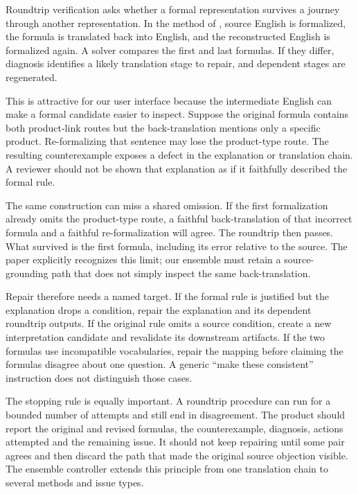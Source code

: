 \label{sec:languages-roundtrip}
Roundtrip verification asks whether a formal representation survives a journey
through another representation. In the method of \citet{roundtrip2026}, source
English is formalized, the formula is translated back into English, and the
reconstructed English is formalized again. A solver compares the first and
last formulas. If they differ, diagnosis identifies a likely translation
stage to repair, and dependent stages are regenerated.

This is attractive for our user interface because the intermediate English
can make a formal candidate easier to inspect. Suppose the original formula
contains both product-link routes but the back-translation mentions only a
specific product. Re-formalizing that sentence may lose the product-type
route. The resulting counterexample exposes a defect in the explanation or
translation chain. A reviewer should not be shown that explanation as if it
faithfully described the formal rule.

The same construction can miss a shared omission. If the first formalization
already omits the product-type route, a faithful back-translation of that
incorrect formula and a faithful re-formalization will agree. The roundtrip
then passes. What survived is the first formula, including its error relative
to the source. The paper explicitly recognizes this limit; our ensemble must
retain a source-grounding path that does not simply inspect the same
back-translation.


Repair therefore needs a named target. If the formal rule is justified but
the explanation drops a condition, repair the explanation and its dependent
roundtrip outputs. If the original rule omits a source condition, create a
new interpretation candidate and revalidate its downstream artifacts. If the
two formulas use incompatible vocabularies, repair the mapping before claiming
the formulas disagree about one question. A generic ``make these consistent''
instruction does not distinguish those cases.

The stopping rule is equally important. A roundtrip procedure can run for a
bounded number of attempts and still end in disagreement. The product should
report the original and revised formulas, the counterexample, diagnosis,
actions attempted and the remaining issue. It should not keep repairing
until some pair agrees and then discard the path that made the original
source objection visible. The ensemble controller extends this principle
from one translation chain to several methods and issue types.

